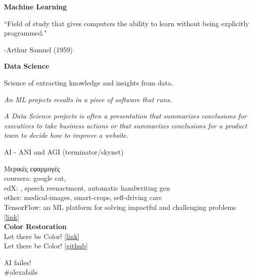 \documentclass[10pt, compress]{beamer}
\begin{document}
\begin{frame}
  \begin{multicols}{2}
  \textbf{Machine Learning}

  ``Field of study that gives computers the ability to learn without being explicitly programmed."

  -Arthur Samuel (1959)

  \columnbreak

  \textbf{Data Science}

  Science of extracting knowledge and insights from data.


  \end{multicols}

  \begin{multicols}{2}
    \textit{An ML projects results in a piece of software that runs.}

    \columnbreak

    \textit{A Data Science projects is often a presentation that summarizes conclusions for executives to take business actions or that summarizes conclusions for a product team to decide how to improve a website.}

  \end{multicols}
\end{frame}

\begin{frame}
    AI - ANI and AGI (terminator/skynet)
\end{frame}

\begin{frame}

  Μερικές εφαρμογές \\
  coursera: google cat,  \\
  edX: , speech reenactment, automatic handwriting gen \\
  other:  medical-images, smart-crops, sefl-driving cars \\

  TensorFlow: an ML platform for solving impactful and challenging problems [\href{https://www.youtube.com/watch?v=NlpS-DhayQA}{link}] \\
  \textbf{Color Restoration} \\
  Let there be Color! [\href{http://iizuka.cs.tsukuba.ac.jp/projects/colorization/extra.html}{link}] \\
  Let there be Color! [\href{https://github.com/satoshiiizuka/siggraph2016_colorization}{github}]
\end{frame}

\begin{frame}
AI failes!\\
\#alexafails
\end{frame}
\end{document}

